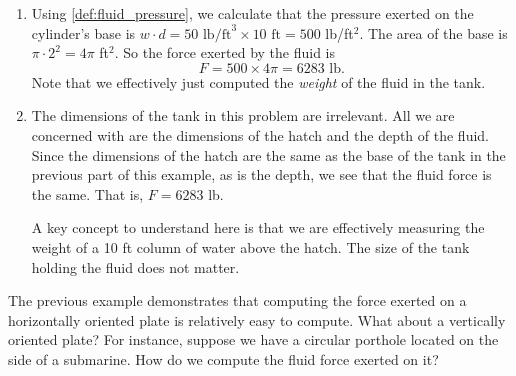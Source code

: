 \begin{example}
{\begin{enumerate}
{}
%
\end{enumerate}}\vspace{0pt}
\solution
%
\begin{enumerate}
	\item	Using \autoref{def:fluid_pressure}, we calculate that the pressure exerted on the cylinder's base is $w\cdot d = 50 \text{ lb/ft}^3\times 10\text{ ft} = 500$ lb/ft$^2$. The area of the base is $\pi\cdot 2^2 = 4\pi$ ft$^2$. So the force exerted by the fluid is 
	\[F = 500\times 4\pi = 6283\text{ lb}.\]
Note that we effectively just computed the \emph{weight} of the fluid in the tank.

	\item	The dimensions of the tank in this problem are irrelevant. All we are concerned with are the dimensions of the hatch and the depth of the fluid. Since the dimensions of the hatch are the same as the base of the tank in the previous part of this example, as is the depth, we see that the fluid force is the same. That is, $F = 6283$ lb. 
	
	A key concept to understand here is that we are effectively measuring the weight of a 10 ft column of water above the hatch. The size of the tank holding the fluid does not matter.
\end{enumerate}
\end{example}

The previous example demonstrates that computing the force exerted on a horizontally oriented plate is relatively easy to compute. What about a vertically oriented plate? For instance, suppose we have a circular porthole located on the side of a submarine. How do we compute the fluid force exerted on it?

